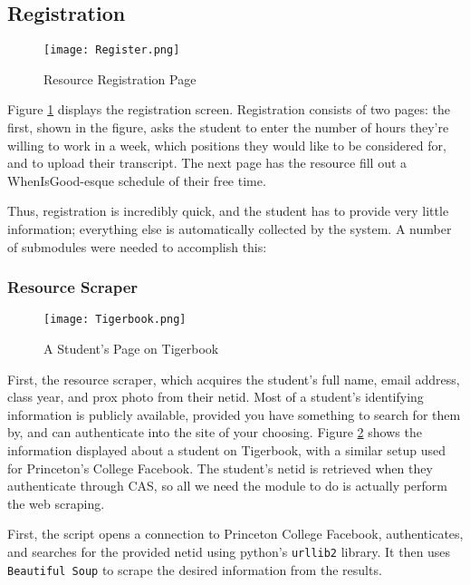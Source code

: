 \subsection{Registration}

\begin{figure}[!htbp]
    \centering
    \texttt{[image: Register.png]}
    \caption{Resource Registration Page}
    \label{fig:registration}
\end{figure}

Figure \ref{fig:registration} displays the registration screen. Registration consists of two pages: the first, shown in the figure, asks the student to enter the number of hours they're willing to work in a week, which positions they would like to be considered for, and to upload their transcript. The next page has the resource fill out a WhenIsGood-esque schedule of their free time.

Thus, registration is incredibly quick, and the student has to provide very little information; everything else is automatically collected by the system. A number of submodules were needed to accomplish this:

\subsubsection{Resource Scraper}

\begin{figure}[!htbp]
    \centering
    \texttt{[image: Tigerbook.png]}
    \caption{A Student's Page on Tigerbook}
    \label{fig:tigerbook}
\end{figure}

\newpage
First, the resource scraper, which acquires the student's full name, email address, class year, and prox photo from their netid. Most of a student's identifying information is publicly available, provided you have something to search for them by, and can authenticate into the site of your choosing. Figure \ref{fig:tigerbook} shows the information displayed about a student on Tigerbook, with a similar setup used for Princeton's College Facebook. The student's netid is retrieved when they authenticate through CAS, so all we need the module to do is actually perform the web scraping.

First, the script opens a connection to Princeton College Facebook, authenticates, and searches for the provided netid using python's \texttt{urllib2} library. It then uses \texttt{Beautiful Soup} to scrape the desired information from the results.

